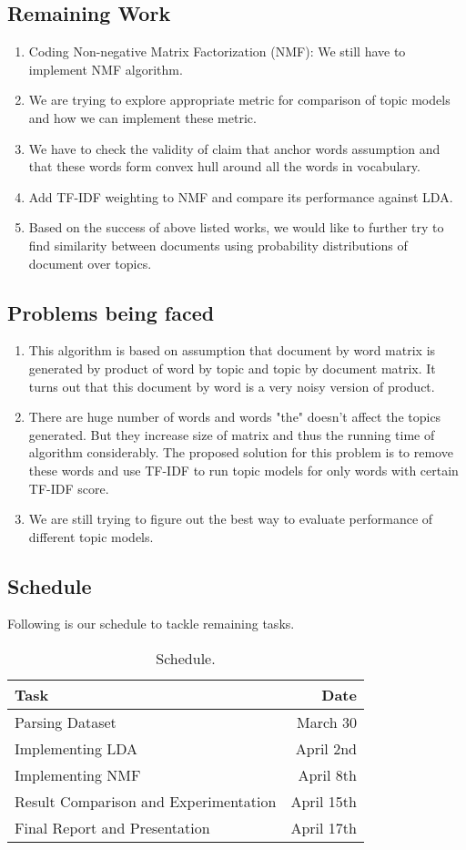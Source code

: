 \documentclass[a4paper,11pt]{article}
\begin{document}
\subsection{Remaining Work}
\begin{enumerate}
\item Coding Non-negative Matrix Factorization (NMF): We still have to implement NMF algorithm.
\item We are trying to explore appropriate metric for comparison of topic models and how we can implement these metric.
\item We have to check the validity of claim that anchor words assumption and that these words form convex hull around all the words in vocabulary.
\item Add TF-IDF weighting to NMF and compare its performance against LDA.
\item Based on the success of above listed works, we would like to further try to find similarity between documents using probability distributions of document over topics.
\end{enumerate}


\subsection{Problems being faced}
\begin{enumerate}
\item This algorithm is based on assumption that document by word matrix is generated by product of word by topic and topic by document matrix. It turns out that this document by word is a very noisy version of product. 
\item There are huge number of words and words "the" doesn't affect the topics generated. But they increase size of matrix and thus the running time of algorithm considerably. The proposed solution for this problem is to remove these words and use TF-IDF to run topic models for only words with certain TF-IDF score.
\item We are still trying to figure out the best way to evaluate performance of different topic models. 
\end{enumerate}


\subsection{Schedule}
Following is our schedule to tackle remaining tasks. 
\begin{table}
\centering
\begin{tabular}[htb]{l|r}
Task & Date\\\hline
Parsing Dataset & March 30 \\
Implementing LDA & April 2nd \\
Implementing NMF & April 8th \\
Result Comparison and Experimentation & April 15th \\
Final Report and Presentation & April 17th
\end{tabular}
\caption{\label{tab:widgets}Schedule.}
\end{table}
\end{document}
